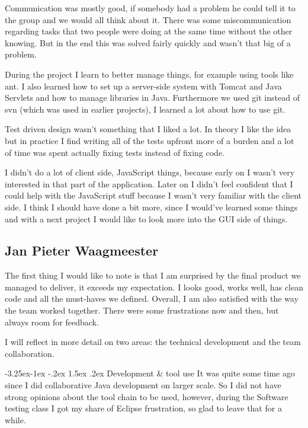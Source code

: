 \documentclass[a4paper]{article}
\makeatletter
\renewcommand\paragraph{\@startsection{paragraph}{4}{\z@}%
  {-3.25ex\@plus -1ex \@minus -.2ex}%
  {1.5ex \@plus .2ex}%
  {\normalfont\normalsize\bfseries}}
\makeatother
\begin{document}
Communication was mostly good, if somebody had a problem he could tell it to the group and we would all think about it. There was some miscommunication regarding tasks that two people were doing at the same time without the other knowing. But in the end this was solved fairly quickly and wasn't that big of a problem.

During the project I learn to better manage things, for example using tools like ant. I also learned how to set up a server-side system with Tomcat and Java Servlets and how to manage libraries in Java. Furthermore we used git instead of svn (which was used in earlier projects), I learned a lot about how to use git.

Test driven design wasn't something that I liked a lot. In theory I like the idea but in practice I find writing all of the tests upfront more of a burden and a lot of time was spent actually fixing tests instead of fixing code.

I didn't do a lot of client side, JavaScript things, because early on I wasn't very interested in that part of the application. Later on I didn't feel confident that I could help with the JavaScript stuff because I wasn't very familiar with the client side. I think I should have done a bit more, since I would've learned some things and with a next project I would like to look more into the GUI side of things.

\subsection{Jan Pieter Waagmeester}
The first thing I would like to note is that I am surprised by the final product we managed to deliver, it exceeds my expectation. I looks good, works well, has clean code and all the must-haves we defined. Overall, I am also satisfied with the way the team worked together. There were some frustrations now and then, but always room for feedback. 

I will reflect in more detail on two areas: the technical development and the team collaboration.

\paragraph{Development \& tool use}
It was quite some time ago since I did collaborative Java development on larger scale. So I did not have strong opinions about the tool chain to be used, however, during the Software testing class I got my share of Eclipse frustration, so glad to leave that for a while.
\end{document}
